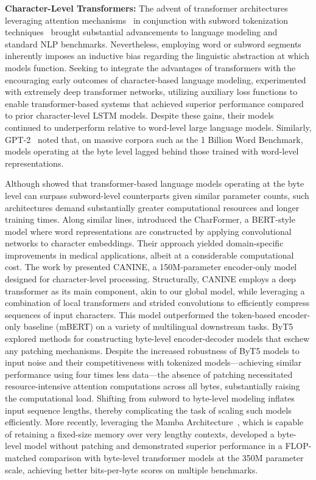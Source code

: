 \textbf{Character-Level Transformers:} The advent of transformer architectures leveraging attention mechanisms~\citep{vaswani2017attention} in conjunction with subword tokenization techniques~\citep{sennrich-etal-2016-neural} brought substantial advancements to language modeling and standard NLP benchmarks. Nevertheless, employing word or subword segments inherently imposes an inductive bias regarding the linguistic abstraction at which models function. Seeking to integrate the advantages of transformers with the encouraging early outcomes of character-based language modeling, \citet{al2019character} experimented with extremely deep transformer networks, utilizing auxiliary loss functions to enable transformer-based systems that achieved superior performance compared to prior character-level LSTM models. Despite these gains, their models continued to underperform relative to word-level large language models. Similarly, GPT-2~\citep{radfordgpt2} noted that, on massive corpora such as the 1 Billion Word Benchmark, models operating at the byte level lagged behind those trained with word-level representations.

Although \cite{Choe2019BridgingTG} showed that transformer-based language models operating at the byte level can surpass subword-level counterparts given similar parameter counts, such architectures demand substantially greater computational resources and longer training times. Along similar lines, \cite{el2020characterbert} introduced the CharFormer, a BERT-style model where word representations are constructed by applying convolutional networks to character embeddings. Their approach yielded domain-specific improvements in medical applications, albeit at a considerable computational cost. The work by \cite{clark2022canine} presented CANINE, a 150M-parameter encoder-only model designed for character-level processing. Structurally, CANINE employs a deep transformer as its main component, akin to our global model, while leveraging a combination of local transformers and strided convolutions to efficiently compress sequences of input characters. This model outperformed the token-based encoder-only baseline (mBERT) on a variety of multilingual downstream tasks. ByT5~\citep{xue2022byt5} explored methods for constructing byte-level encoder-decoder models that eschew any patching mechanisms. Despite the increased robustness of ByT5 models to input noise and their competitiveness with tokenized models—achieving similar performance using four times less data—the absence of patching necessitated resource-intensive attention computations across all bytes, substantially raising the computational load. Shifting from subword to byte-level modeling inflates input sequence lengths, thereby complicating the task of scaling such models efficiently. More recently, leveraging the Mamba Architecture~\citep{gu2023mamba}, which is capable of retaining a fixed-size memory over very lengthy contexts, \cite{wang2024mambabyte} developed a byte-level model without patching and demonstrated superior performance in a FLOP-matched comparison with byte-level transformer models at the 350M parameter scale, achieving better bits-per-byte scores on multiple benchmarks.

